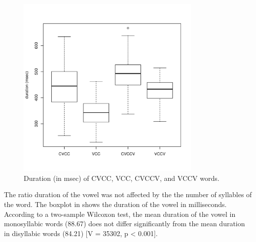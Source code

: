 \documentclass[11pt,a4paper,openany]{memoir}\usepackage[]{graphicx}\usepackage[]{color}
\newenvironment{knitrout}{}{} %
\begin{document}
\begin{figure}
\centering
\begin{knitrout}
\color{fgcolor}
\includegraphics[width=0.8\textwidth]{img/word-duration-1} 

\end{knitrout}
\caption{Duration (in msec) of CVCC, VCC, CVCCV, and VCCV words.}
\label{f:worddur}
\end{figure}



The ratio duration of the vowel was not affected by the the number of syllables of the word.
The boxplot in  shows the duration of the vowel in milliseconds.
According to a two-sample Wilcoxon test, the mean duration of the vowel in monosyllabic words (88.67) does not differ significantly from the mean duration in disyllabic words (84.21) [V = 35302, p < 0.001].
\end{document}

